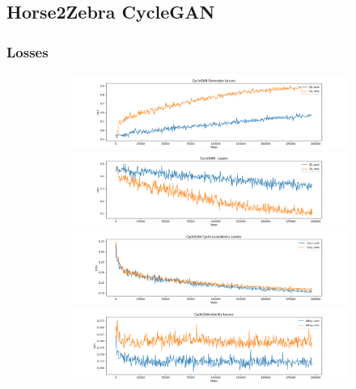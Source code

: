 \documentclass[12pt, fleqn, titlepage]{article}
\begin{document}
\subsection{Horse2Zebra CycleGAN}\label{horse2zebra_cyclegan}


\subsubsection{Losses}

\begin{figure}[H]
	\centering
	\begin{subfigure}[b]{0.8\textwidth}
		\centering
		\includegraphics[width=\linewidth]{imgs/horse2zebra_generator_losses}
		\hfill
		\includegraphics[width=\linewidth]{imgs/horse2zebra_discriminator_losses}
		\hfill
		\includegraphics[width=\linewidth]{imgs/horse2zebra_cycle_losses}
		\hfill
		\includegraphics[width=\linewidth]{imgs/horse2zebra_identity_losses}
	\end{subfigure}
\end{figure}
\end{document}
